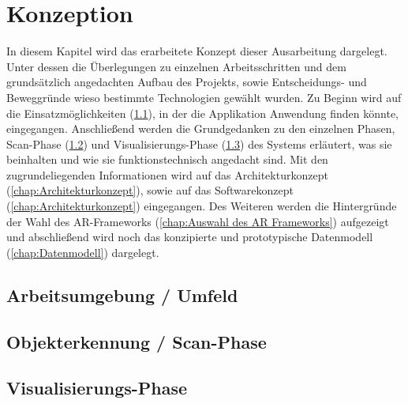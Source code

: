
\chapter{Konzeption}
\label{chap:Konzeption}
In diesem Kapitel wird das erarbeitete Konzept dieser Ausarbeitung dargelegt. Unter dessen die Überlegungen zu einzelnen 
Arbeitsschritten und dem grundsätzlich angedachten Aufbau des Projekts, sowie Entscheidungs- und Beweggründe wieso bestimmte 
Technologien gewählt wurden. Zu Beginn wird auf die Einsatzmöglichkeiten (\ref{chap:Arbeitsumgebung}), in der die Applikation Anwendung 
finden könnte, eingegangen. Anschließend werden die Grundgedanken zu den einzelnen Phasen, Scan-Phase (\ref{chap:Scan-Phase}) und 
Visualisierungs-Phase (\ref{chap:Visualisierungs-Phase}) des Systems erläutert, was sie beinhalten und wie sie funktionstechnisch 
angedacht sind. Mit den zugrundeliegenden Informationen wird auf das Architekturkonzept (\ref{chap:Architekturkonzept}), sowie auf das 
Softwarekonzept (\ref{chap:Architekturkonzept}) eingegangen. Des Weiteren werden die Hintergründe der Wahl des AR-Frameworks 
(\ref{chap:Auswahl des AR Frameworks}) aufgezeigt und abschließend wird noch das konzipierte und prototypische Datenmodell 
(\ref{chap:Datenmodell}) dargelegt.

\section{Arbeitsumgebung / Umfeld}
\label{chap:Arbeitsumgebung}

\section{Objekterkennung / Scan-Phase}
\label{chap:Scan-Phase}

\section{Visualisierungs-Phase}
\label{chap:Visualisierungs-Phase}

